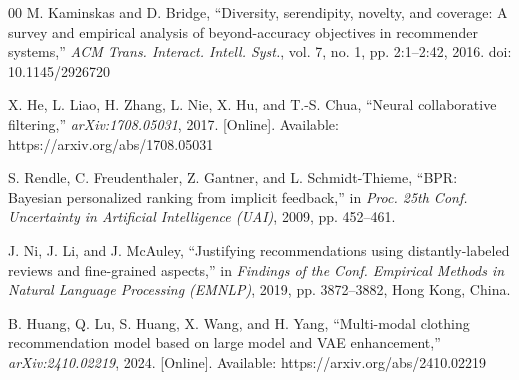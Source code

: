 \documentclass[conference]{IEEEtran}
\begin{document}
\begin{thebibliography}{00}
 M. Kaminskas and D. Bridge, ``Diversity, serendipity, novelty, and coverage: A survey and empirical analysis of beyond-accuracy objectives in recommender systems,'' \textit{ACM Trans. Interact. Intell. Syst.}, vol. 7, no. 1, pp. 2:1--2:42, 2016. doi: 10.1145/2926720

 X. He, L. Liao, H. Zhang, L. Nie, X. Hu, and T.-S. Chua, ``Neural collaborative filtering,'' \textit{arXiv:1708.05031}, 2017. [Online]. Available: https://arxiv.org/abs/1708.05031

 S. Rendle, C. Freudenthaler, Z. Gantner, and L. Schmidt-Thieme, ``BPR: Bayesian personalized ranking from implicit feedback,'' in \textit{Proc. 25th Conf. Uncertainty in Artificial Intelligence (UAI)}, 2009, pp. 452--461.

 J. Ni, J. Li, and J. McAuley, ``Justifying recommendations using distantly-labeled reviews and fine-grained aspects,'' in \textit{Findings of the Conf. Empirical Methods in Natural Language Processing (EMNLP)}, 2019, pp. 3872--3882, Hong Kong, China.

 B. Huang, Q. Lu, S. Huang, X. Wang, and H. Yang, ``Multi-modal clothing recommendation model based on large model and VAE enhancement,'' \textit{arXiv:2410.02219}, 2024. [Online]. Available: https://arxiv.org/abs/2410.02219

\end{thebibliography}
\end{document}
